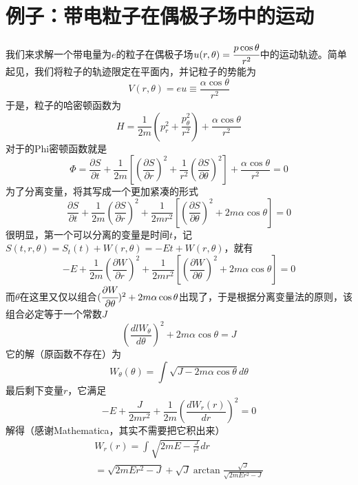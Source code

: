 \documentclass{ctexart}
\begin{document}
\section{例子：带电粒子在偶极子场中的运动}
我们来求解一个带电量为$e$的粒子在偶极子场$u(r,\theta) = \cfrac{p \cos \theta}{r^2}$中的运动轨迹。简单起见，我们将粒子的轨迹限定在平面内，并记粒子的势能为
\begin{equation}
V(r,\theta) = eu \equiv \frac{\alpha \cos \theta}{r^2}
\end{equation}
于是，粒子的哈密顿函数为
\begin{equation}
H = \frac{1}{2m}(p_r^2 + \frac{p_\theta^2}{r^2}) + \frac{\alpha \cos \theta}{r^2}
\end{equation}
对于的Phi密顿函数就是
\begin{equation}
\varPhi = \frac{\partial S}{\partial t} + \frac{1}{2m}[(\frac{\partial S}{\partial r})^2 + \frac{1}{r^2}(\frac{\partial S}{\partial \theta})^2] + \frac{\alpha \cos \theta}{r^2} = 0
\end{equation}
为了分离变量，将其写成一个更加紧凑的形式
\begin{equation}
\frac{\partial S}{\partial t} + \frac{1}{2m} (\frac{\partial S}{\partial r})^2 + \frac{1}{2mr^2}[(\frac{\partial S}{\partial \theta})^2 + 2m\alpha \cos \theta] = 0
\end{equation}
很明显，第一个可以分离的变量是时间$t$，记$S(t,r,\theta) = S_t(t) + W(r,\theta) = -Et+ W(r,\theta)$，就有
\begin{equation}
-E + \frac{1}{2m} (\frac{\partial W}{\partial r})^2 + \frac{1}{2mr^2}[(\frac{\partial W}{\partial \theta})^2 + 2m\alpha \cos \theta] = 0
\end{equation}
而$\theta$在这里又仅以组合$(\cfrac{\partial W}{\partial \theta})^2 + 2m\alpha \cos \theta$出现了，于是根据分离变量法的原则，该组合必定等于一个常数$J$
\begin{equation}
(\frac{dl W_\theta}{d \theta})^2 + 2m\alpha \cos \theta = J
\end{equation}
它的解（原函数不存在）为
\begin{equation}
W_\theta(\theta) = \int \sqrt{J - 2m\alpha \cos \theta} d\theta 
\end{equation}
最后剩下变量$r$，它满足
\begin{equation}
-E+\frac{J}{2mr^2} + \frac{1}{2m}(\frac{d W_r(r)}{dr})^2 = 0
\end{equation}
解得（感谢Mathematica，其实不需要把它积出来）
\begin{multline}
W_r(r) = \int \sqrt{2mE - \frac{J}{r^2}} dr \\
= \sqrt{2mE r^2-J}+\sqrt{J} \arctan\frac{\sqrt{J}}{\sqrt{2mE r^2-J}}
\end{multline}
\end{document}

